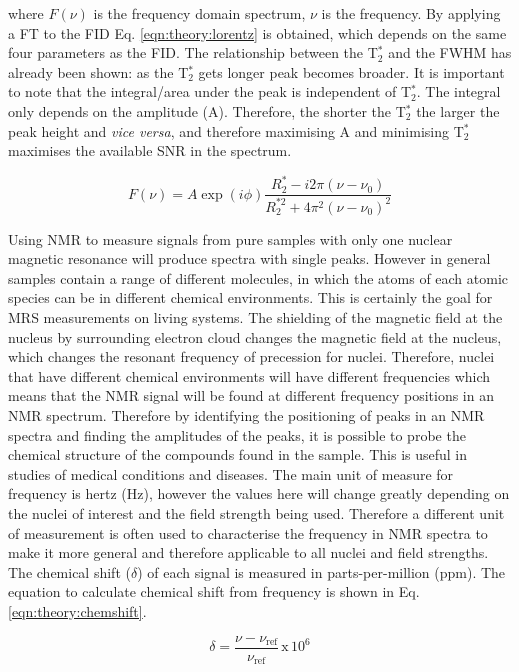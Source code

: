 \noindent where $F(\nu)$ is the frequency domain spectrum, $\nu$ is the frequency. By applying a \ac{FT} to the \ac{FID} Eq. \ref{eqn:theory:lorentz} is obtained, which depends on the same four parameters as the \ac{FID}. The relationship between the T$_2^*$ and the FWHM has already been shown: as the T$_2^*$ gets longer peak becomes broader. It is important to note that the integral/area under the peak is independent of T$_2^*$. The integral only depends on the amplitude (A). Therefore, the shorter the T$_2^*$ the larger the peak height and \textit{vice versa}, and therefore maximising A and minimising T$_2^*$ maximises the available \ac{SNR} in the spectrum.

\begin{equation}
    F(\nu) = A\exp(i\phi)\frac{R_2^*-i2\pi(\nu-\nu_0)}{R_2^{*2}+4\pi^2(\nu-\nu_0)^2}
    \label{eqn:theory:lorentz}
\end{equation}

Using \ac{NMR} to measure signals from pure samples with only one nuclear magnetic resonance will produce spectra with single peaks. However in general samples contain a range of different molecules, in which the atoms of each atomic species can be in different chemical environments. This is certainly the goal for \ac{MRS} measurements on living systems. The shielding of the magnetic field at the nucleus by surrounding electron cloud changes the magnetic field at the nucleus, which changes the resonant frequency of precession for nuclei. Therefore, nuclei that have different chemical environments will have different frequencies which means that the \ac{NMR} signal will be found at different frequency positions in an \ac{NMR} spectrum. Therefore by identifying the positioning of peaks in an \ac{NMR} spectra and finding the amplitudes of the peaks, it is possible to probe the chemical structure of the compounds found in the sample. This is useful in studies of medical conditions and diseases. The main unit of measure for frequency is hertz (Hz), however the values here will change greatly depending on the nuclei of interest and the field strength being used. Therefore a different unit of measurement is often used to characterise the frequency in \ac{NMR} spectra to make it more general and therefore applicable to all nuclei and field strengths. The chemical shift ($\delta$) of each signal is measured in parts-per-million (ppm). The equation to calculate chemical shift from frequency is shown in Eq. \ref{eqn:theory:chemshift}.

\begin{equation}
    \delta = \frac{\nu - \nu_{\textrm{ref}}}{\nu_\textrm{ref}} \, \textrm{x} \, 10^6
    \label{eqn:theory:chemshift}
\end{equation}

